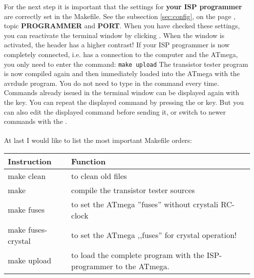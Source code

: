 For the next step it is important that the settings for
\textbf {your ISP programmer} are correctly set in the Makefile.
See the subsection \ref{sec:config}, on the page \pageref{sec:config-Prog},
topic \textbf{PROGRAMMER} and \textbf{PORT}.
When you have checked these settings, you can reactivate the terminal window by clicking \LMB.
When the window is activated, the header has a higher contrast!
If your ISP programmer is now completely connected,
i.e. has a connection to the computer and the ATmega, you only need to enter the command:
\large{\newline\verb"make upload"\newline}
The transistor tester program is now compiled again and then immediately loaded
into the ATmega with the avrdude program.
You do not need to type in the command every time.
Commands already issued in the terminal window can be displayed again with
the  key.
You can repeat the displayed command by pressing the \keys{\enter} or \keys{\return} key.
But you can also edit the displayed command before sending it,
or switch to newer commands with the .\\
\\
At last I would like to list the most important Makefile orders:
\begin{table}[H]
    \begin{tabular}{ l | l}
	Instruction & Function\\
    \hline
    make clean & to clean old files\\
    make       & compile the transistor tester sources\\
    make fuses & to set the ATmega ''fuses'' without crystali RC-clock\\
    make fuses-crystal & to set the ATmega ,,fuses'' for crystal operation!\\
    make upload & to load the complete program with the ISP-programmer to the ATmega.\\
    \end{tabular}
\end{table}

